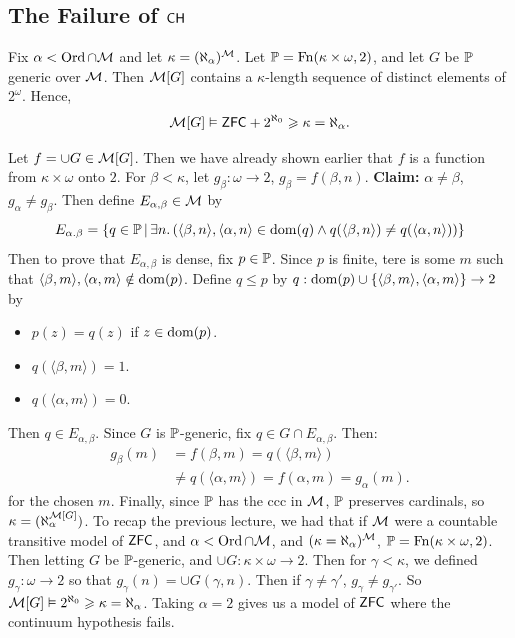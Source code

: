 \documentclass{article}
\begin{document}
    \subsection{The Failure of $\mathsf{CH}$}
    \begin{fancythm}{}
        Fix $\alpha < \operatorname{Ord} \cap \mathcal{M}$ and let $\kappa = (\aleph_{\alpha})^{\mathcal{M}}$. Let $\mathbb{P} = \operatorname{Fn}(\kappa \times \omega, 2)$, and let $G$ be $\mathbb{P}$ generic over $\mathcal{M}$. Then $\mathcal{M}[G]$ contains a $\kappa$-length sequence of distinct elements of $2^{\omega}$. Hence, \[ \mathcal{M}[G] \vDash \mathsf{ZFC} + 2^{\aleph_{0}} \geqslant \kappa = \aleph_{\alpha}.\]
    \end{fancythm}
    \proof Let $f = \cup G \in \mathcal{M}[G]$. Then we have already shown earlier that $f$ is a function from $\kappa \times \omega$ onto $2$. For $\beta < \kappa$, let $g_{\beta} : \omega \to 2$, $g_{\beta}=f(\beta,n)$. \gap
    \textbf{Claim:} $\alpha \neq \beta$, $g_{\alpha} \neq g_{\beta}$. Then define $E_{\alpha,\beta} \in \mathcal{M}$ by \[ E_{\alpha. \beta} = \{ q \in \mathbb{P} \, | \, \exists n. \, (\langle \beta, n\rangle, \langle \alpha, n \rangle \in \operatorname{dom}(q) \wedge q(\langle \beta, n \rangle) \neq q(\langle \alpha, n \rangle))\}\]
    Then to prove that $E_{\alpha, \beta}$ is dense, fix $p \in \mathbb{P}$. Since $p$ is finite, tere is some $m$ such that $\langle \beta, m \rangle, \langle \alpha, m \rangle \notin \operatorname{dom}(p)$. \gap
    Define $q \leq p$ by $q : \operatorname{dom}(p) \cup \{\langle \beta, m \rangle, \langle \alpha, m \rangle \} \to 2$ by \begin{itemize}
        \item $p(z) = q(z)$ if $z \in \operatorname{dom}(p)$.
        \item $q(\langle \beta, m \rangle) = 1$.
        \item $q(\langle \alpha, m \rangle) =0$.
    \end{itemize}
    Then $q \in E_{\alpha, \beta}$. Since $G$ is $\mathbb{P}$-generic, fix $q \in G \cap E_{\alpha, \beta}$. Then: \begin{align*}
        g_{\beta}(m) & = f(\beta, m) = q(\langle \beta, m \rangle)                       \\
                     & \neq q(\langle \alpha, m \rangle) = f(\alpha, m) = g_{\alpha}(m).
    \end{align*}
    for the chosen $m$.\gap
    Finally, since $\mathbb{P}$ has the ccc in $\mathcal{M}$, $\mathbb{P}$ preserves cardinals, so $\kappa = (\aleph_{\alpha}^{\mathcal{M}[G]})$.
    \newlec
    To recap the previous lecture, we had that if $\mathcal{M}$ were a countable transitive model of $\mathsf{ZFC}$, and $\alpha < \operatorname{Ord} \cap \mathcal{M}$, and $(\kappa = \aleph_{\alpha})^{\mathcal{M}}$, $\mathbb{P} = \operatorname{Fn}(\kappa \times \omega, 2)$. Then letting $G$ be $\mathbb{P}$-generic, and $\cup G : \kappa \times \omega \to 2$. \gap Then for $\gamma < \kappa$, we defined $g_{\gamma} : \omega \to 2$ so that $g_{\gamma}(n) = \cup G(\gamma, n)$. Then if $\gamma \neq \gamma'$, $g_{\gamma} \neq g_{\gamma'}$. So $\mathcal{M}[G] \vDash 2^{\aleph_{0}}\geqslant \kappa = \aleph_{\alpha}$. Taking $\alpha=2$ gives us a model of $\mathsf{ZFC}$ where the continuum hypothesis fails.
\end{document}
